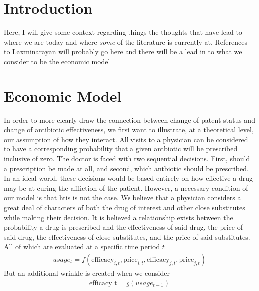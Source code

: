 \documentclass[11pt]{SelfArxOneColBMN}
\affiliation{\textsuperscript{1}\textit{John E. Walker Department of Economics,
Clemson University,Clemson, SC: email ijdavis@g.clemson.edu}}
\date{\small{Version 01142020 : Compiled ~\today}}
\begin{document}
\flushbottom

\maketitle
{}
\tableofcontents
\thispagestyle{empty}
\newpage
	
\section{Introduction}
\label{sec:introduction}

\noindent
Here, I will give some context regarding things the thoughts that have lead to where we are today and where \textit{some} of the literature is currently at. References to Laxminarayan will probably go here and there will be a lead in to what we consider to be the economic model

\section{Economic Model}
\label{sec:economic model}

\noindent
In order to more clearly draw the connection between change of patent status and change of antibiotic effectiveness, we first want to illustrate, at a theoretical level, our assumption of how they interact. All visits to a physician can be considered to have a corresponding probability that a given antbiotic will be prescribed inclusive of zero. The doctor is faced with two sequential decisions. First, should a prescription be made at all, and second, which antbiotic should be prescribed. In an ideal world, these decisions would be based entirely on how effective a drug may be at curing the affliction of the patient. However, a necessary condition of our model is that htis is not the case. We believe that a physician considers a great deal of characters of both the drug of interest and other close substitutes while making their decision. It is believed a relationship exists between the probability a drug is prescribed and the effectiveness of said drug, the price of said drug, the effectiveness of close substitutes, and the price of said substitutes. All of which are evaluated at a specific time period $t$
\begin{eqnarray}
  usage_t = f(\text{efficacy}_{i,t},\text{price}_{i,t},\text{efficacy}_{j,t},\text{price}_{j,t})
\end{eqnarray}
But an additional wrinkle is created when we consider 
\begin{eqnarray}
  \text{efficacy_t} = g(usage_{t-1})
\end{eqnarray}
\end{document}
